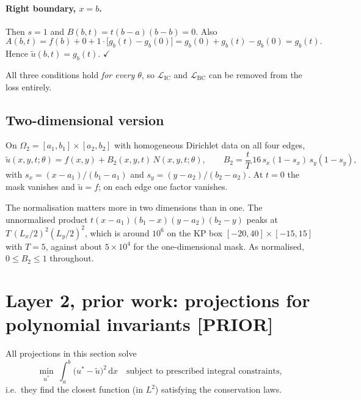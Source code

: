 \documentclass[11pt,a4paper]{article}
\theoremstyle{remark}
\newcommand{\dx}{\,\mathrm{d}x}
\newcommand{\ut}{\tilde{u}}
\newcommand{\us}{u^{*}}
\newcommand{\Om}{\Omega}
\begin{document}
\paragraph{Right boundary, $x=b$.}
Then $s=1$ and $B(b,t) = t(b-a)(b-b) = 0$. Also
\begin{equation}
A(b,t) = f(b) + 0 + 1\cdot\big[g_b(t)-g_b(0)\big] = g_b(0)+g_b(t)-g_b(0) = g_b(t).
\end{equation}
Hence $\ut(b,t) = g_b(t)$. \hfill$\checkmark$

All three conditions hold \emph{for every $\theta$}, so $\mathcal{L}_{\text{IC}}$
and $\mathcal{L}_{\text{BC}}$ can be removed from the loss entirely.

\subsection{Two-dimensional version}

On $\Om_2 = [a_1,b_1]\times[a_2,b_2]$ with homogeneous Dirichlet data on all four
edges,
\begin{equation}
\ut(x,y,t;\theta) = f(x,y) + B_{2}(x,y,t)\,N(x,y,t;\theta),
\qquad
B_{2} = \frac{t}{T}\,16\,s_x(1-s_x)\,s_y(1-s_y),
\end{equation}
with $s_x = (x-a_1)/(b_1-a_1)$ and $s_y = (y-a_2)/(b_2-a_2)$. At $t=0$ the mask
vanishes and $\ut = f$; on each edge one factor vanishes.

The normalisation matters more in two dimensions than in one. The unnormalised
product $t(x-a_1)(b_1-x)(y-a_2)(b_2-y)$ peaks at
$T\,(L_x/2)^2 (L_y/2)^2$, which is around $10^6$ on the KP box
$[-20,40]\times[-15,15]$ with $T=5$, against about $5\times10^4$ for the
one-dimensional mask. As normalised, $0 \le B_2 \le 1$ throughout.

\section{Layer 2, prior work: projections for polynomial invariants \textbf{[PRIOR]}}
\label{sec:prior}

All projections in this section solve
\begin{equation}
\min_{\us} \ \int_a^b \big(\us - \ut\big)^2 \dx
\quad\text{subject to prescribed integral constraints,}
\end{equation}
i.e.\ they find the closest function (in $L^2$) satisfying the conservation laws.
\end{document}

